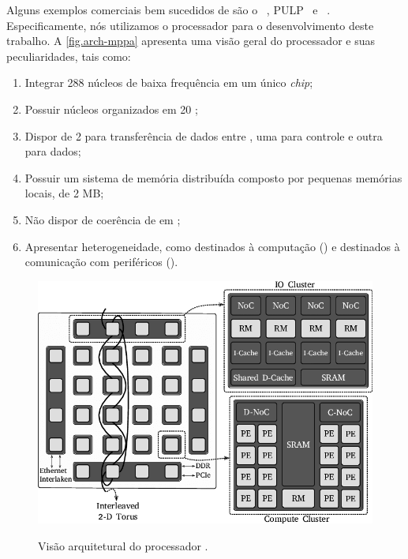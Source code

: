Alguns exemplos comerciais bem sucedidos de \lws são o \mppa~\cite{dinechin:2013}, PULP~\cite{pulp} e \taihulight~\cite{fu2016sunway}.
%
Especificamente, nós utilizamos o processador \mppa para o desenvolvimento deste trabalho. A \autoref{fig.arch-mppa} apresenta uma visão geral do processador \mppa e suas peculiaridades, tais como:

\begin{enumerate}[label=(\roman*)]
    \item Integrar 288 núcleos de baixa frequência em um único \textit{chip};
    \item Possuir núcleos organizados em 20 \clusters;
    \item Dispor de 2 \nocs para transferência de dados entre \clusters, uma para controle e outra para dados;
    \item Possuir um sistema de memória distribuída composto por pequenas memórias locais, \eg \sram de 2 MB;
    \item Não dispor de coerência de \cache em \hardware;
    \item Apresentar heterogeneidade, como \clusters destinados à computação (\cclusters) e \clusters destinados à comunicação com periféricos (\ioclusters).
\end{enumerate}

\begin{figure}[t]
    \centering
    \caption{Visão arquitetural do processador \mppa.}
    \includegraphics[width=0.6\linewidth]{content/images/arch-mppa-gs.png}
    \label{fig.arch-mppa}
\end{figure}

\section{\nanvixos}
\label{sec.nanvixos}

